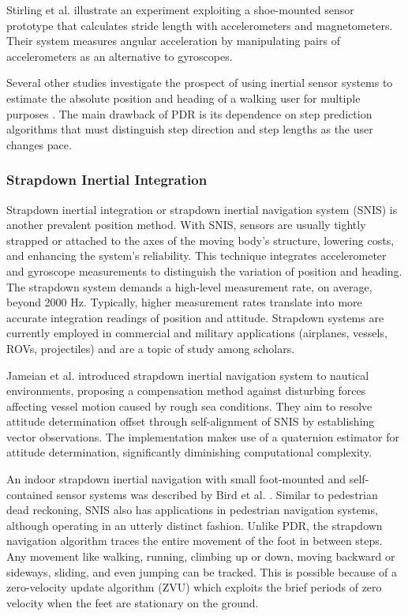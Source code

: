 Stirling et al. \cite{stirling2003innovative} illustrate an experiment exploiting a shoe-mounted sensor prototype that calculates stride length with accelerometers and magnetometers. Their system measures angular acceleration by manipulating pairs of accelerometers as an alternative to gyroscopes.

Several other studies investigate the prospect of using inertial sensor systems to estimate the absolute position and heading of a walking user for multiple purposes \cite{steinhoff2010dead}\cite{weinberg2002using}\cite{kim2004step} \cite{collin2002mems}. The main drawback of PDR is its dependence on step prediction algorithms that must distinguish step direction and step lengths as the user changes pace.

\subsubsection{Strapdown Inertial Integration}

Strapdown inertial integration or strapdown inertial navigation system (SNIS) is another prevalent position method. With SNIS, sensors are usually tightly strapped or attached to the axes of the moving body's structure, lowering costs, and enhancing the system's reliability. This technique integrates accelerometer and gyroscope measurements to distinguish the variation of position and heading. The strapdown system demands a high-level measurement rate, on average, beyond 2000 Hz. Typically, higher measurement rates translate into more accurate integration readings of position and attitude. Strapdown systems are currently employed in commercial and military applications (airplanes, vessels, ROVs, projectiles) and are a topic of study among scholars.

Jameian et al. \cite{jameian2019robust}  introduced strapdown inertial navigation system to nautical environments, proposing a compensation method against disturbing forces affecting vessel motion caused by rough sea conditions. They aim to resolve attitude determination offset through self-alignment of SNIS by establishing vector observations. The implementation makes use of a quaternion estimator for attitude determination, significantly diminishing computational complexity.

An indoor strapdown inertial navigation with small foot-mounted and self-contained sensor systems was described by Bird et al. \cite{bird2011indoor}. Similar to pedestrian dead reckoning, SNIS also has applications in pedestrian navigation systems, although operating in an utterly distinct fashion. Unlike PDR, the strapdown navigation algorithm traces the entire movement of the foot in between steps. Any movement like walking, running, climbing up or down, moving backward or sideways, sliding, and even jumping can be tracked. This is possible because of a zero-velocity update algorithm (ZVU) which exploits the brief periods of zero velocity when the feet are stationary on the ground.

